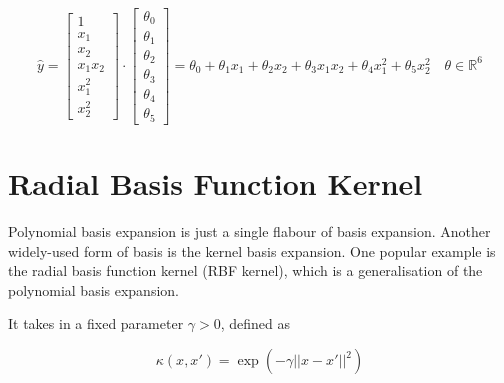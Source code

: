 \begin{equation}
    \hat{y} = \begin{bmatrix} 1 \\ x_1 \\ x_2 \\ x_1x_2 \\ x_1^2 \\ x_2^2 \end{bmatrix} \cdot  \begin{bmatrix} \theta_0 \\ \theta_1 \\ \theta_2 \\ \theta_3 \\ \theta_4 \\ \theta_5 \end{bmatrix} = \theta_0 + \theta_1 x_1 + \theta_2 x_2 + \theta_3 x_1x_2 + \theta_4 x_1^2 + \theta_5 x_2^2 \quad \theta \in \mathbb{R}^6
\end{equation}

\section{Radial Basis Function Kernel}

Polynomial basis expansion is just a single flabour of basis expansion. Another widely-used form of basis is the kernel basis expansion. One popular example is the radial basis function kernel (RBF kernel), which is a generalisation of the polynomial basis expansion. \bigskip

It takes in a fixed parameter $\gamma > 0$, defined as 

\begin{equation}
    \kappa(x, x') = \exp(-\gamma ||x - x'||^2)
\end{equation}

